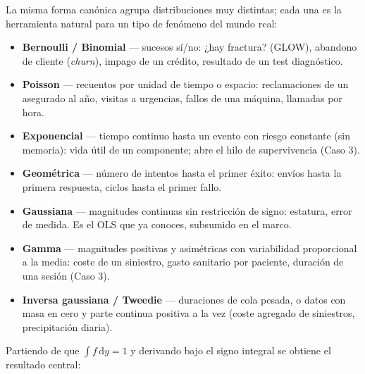 \documentclass[
  letterpaper,
  DIV=11,
  numbers=noendperiod]{scrartcl}
\providecommand{\tightlist}{%
  \setlength{\itemsep}{0pt}\setlength{\parskip}{0pt}}\usepackage{longtable,booktabs,array}
\begin{document}
\begin{tcolorbox}[enhanced jigsaw, breakable, colframe=quarto-callout-note-color-frame, left=2mm, arc=.35mm, colbacktitle=quarto-callout-note-color!10!white, toprule=.15mm, colback=white, coltitle=black, rightrule=.15mm, opacitybacktitle=0.6, title=\textcolor{quarto-callout-note-color}{\faInfo}\hspace{0.5em}{Quién vive en esta familia (y para qué sirve)}, titlerule=0mm, toptitle=1mm, bottomtitle=1mm, leftrule=.75mm, bottomrule=.15mm, opacityback=0]

La misma forma canónica agrupa distribuciones muy distintas; cada una es
la herramienta natural para un tipo de fenómeno del mundo real:

\begin{itemize}
\tightlist
\item
  \textbf{Bernoulli / Binomial} --- sucesos sí/no: ¿hay fractura?
  (GLOW), abandono de cliente (\emph{churn}), impago de un crédito,
  resultado de un test diagnóstico.
\item
  \textbf{Poisson} --- recuentos por unidad de tiempo o espacio:
  reclamaciones de un asegurado al año, visitas a urgencias, fallos de
  una máquina, llamadas por hora.
\item
  \textbf{Exponencial} --- tiempo continuo hasta un evento con riesgo
  constante (sin memoria): vida útil de un componente; abre el hilo de
  supervivencia (Caso 3).
\item
  \textbf{Geométrica} --- número de intentos hasta el primer éxito:
  envíos hasta la primera respuesta, ciclos hasta el primer fallo.
\item
  \textbf{Gaussiana} --- magnitudes continuas sin restricción de signo:
  estatura, error de medida. Es el OLS que ya conoces, subsumido en el
  marco.
\item
  \textbf{Gamma} --- magnitudes positivas y asimétricas con variabilidad
  proporcional a la media: coste de un siniestro, gasto sanitario por
  paciente, duración de una sesión (Caso 3).
\item
  \textbf{Inversa gaussiana / Tweedie} --- duraciones de cola pesada, o
  datos con masa en cero y parte continua positiva a la vez (coste
  agregado de siniestros, precipitación diaria).
\end{itemize}

\end{tcolorbox}

Partiendo de que \(\int f\,\mathrm{d}y=1\) y derivando bajo el signo
integral se obtiene el resultado central:
\end{document}
